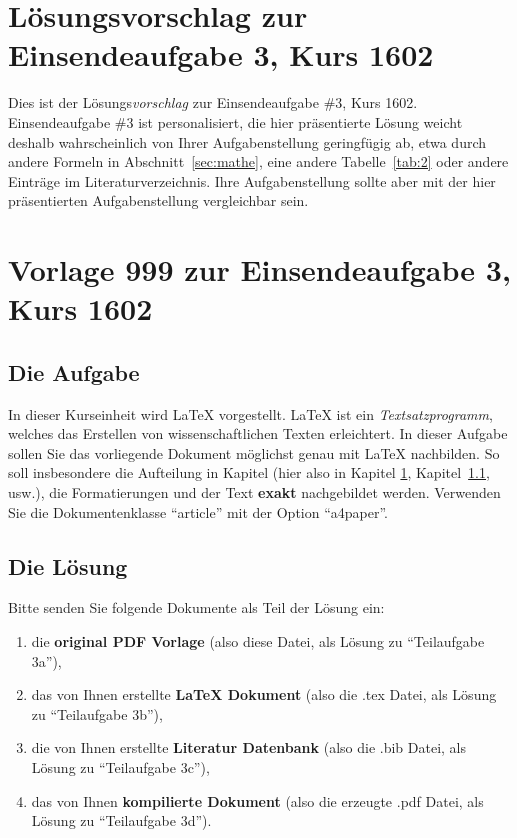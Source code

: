 \documentclass[11pt, a4paper]{article}
\begin{document}
%
%

\setcounter{page}{0}
\section*{Lösungsvorschlag zur Einsendeaufgabe 3, Kurs 1602}

Dies ist der Lösungs\emph{vorschlag} zur Einsendeaufgabe \#3,
Kurs 1602. Einsendeaufgabe \#3 ist personalisiert, die hier
präsentierte Lösung weicht deshalb wahrscheinlich von Ihrer
Aufgabenstellung geringfügig ab, etwa durch andere Formeln in
Abschnitt~\ref{sec:mathe}, eine andere Tabelle~\ref{tab:2} oder
andere Einträge im Literaturverzeichnis. Ihre Aufgabenstellung
sollte aber mit der hier präsentierten Aufgabenstellung
vergleichbar sein.

\pagebreak

%
%

\section{Vorlage 999 zur Einsendeaufgabe 3, Kurs 1602}
\label{sec:1}

\subsection{Die Aufgabe}\label{sec:11}

In dieser Kurseinheit wird LaTeX vorgestellt. LaTeX ist ein
\emph{Textsatzprogramm}, welches das Erstellen von
wissenschaftlichen Texten erleichtert. In dieser Aufgabe sollen
Sie das vorliegende Dokument möglichst genau mit LaTeX
nachbilden. So soll insbesondere die Aufteilung in Kapitel
(hier also in Kapitel \ref{sec:1}, Kapitel~\ref{sec:11}, usw.),
die Formatierungen und der Text \textbf{exakt} nachgebildet
werden. Verwenden Sie die Dokumentenklasse \enquote{article}
mit der Option \enquote{a4paper}.

\subsection{Die Lösung}

Bitte senden Sie folgende Dokumente als Teil der Lösung ein:
\begin{enumerate}
	\item die \textbf{original PDF Vorlage} (also diese
	Datei, als Lösung zu \enquote{Teilaufgabe 3a}),
	
	\item das von Ihnen erstellte \textbf{LaTeX Dokument}
	(also die .tex Datei, als Lösung zu \enquote{Teilaufgabe
	3b}),
	
	\item die von Ihnen erstellte \textbf{Literatur
	Datenbank} (also die .bib Datei, als Lösung zu
	\enquote{Teilaufgabe 3c}),
	
	\item das von Ihnen \textbf{kompilierte Dokument} (also
	die erzeugte .pdf Datei, als Lösung zu
	\enquote{Teilaufgabe 3d}).
\end{enumerate}
\end{document}
